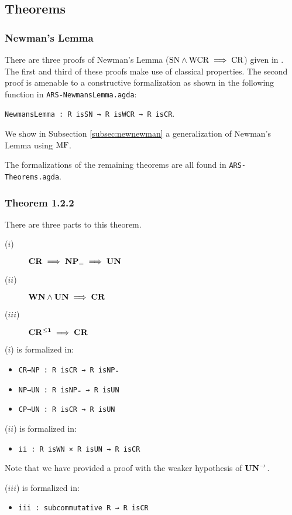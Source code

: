 \subsection{Theorems}\label{subsec:theorems}
\subsubsection{Newman's Lemma}
There are three proofs of Newman's Lemma ($\mathrm{SN} \land \mathrm{WCR} \implies \mathrm{CR}$) given in \terese. 
The first and third of these proofs make use of classical properties. The second proof is amenable to a 
constructive formalization as shown in the following function in \texttt{ARS-NewmansLemma.agda}:

\verb|NewmansLemma : R isSN → R isWCR → R isCR|.

We show in Subsection \ref{subsec:newnewman} a generalization of Newman's Lemma using $\mathrm{MF}$. 

The formalizations of the remaining theorems are all found in \texttt{ARS-Theorems.agda}. 
\subsubsection{Theorem 1.2.2}
There are three parts to this theorem. 
\begin{description}
    \item[($i$)] $\mathbf{CR} \implies \mathbf{NP_=} \implies \mathbf{UN}$
    \item[($ii$)] $\mathbf{WN} \land \mathbf{UN} \implies \mathbf{CR}$  
    \item[($iii$)] $\mathbf{CR^{\le 1}} \implies \mathbf{CR}$
\end{description}

($i$) is formalized in:
\begin{itemize}
    \item \verb|CR→NP : R isCR → R isNP₌|
    \item \verb|NP→UN : R isNP₌ → R isUN|
    \item \verb|CP→UN : R isCR → R isUN|
\end{itemize}

($ii$) is formalized in:
\begin{itemize}
    \item \verb|ii : R isWN × R isUN → R isCR|
\end{itemize}
Note that we have provided a proof with the weaker hypothesis of $\mathbf{UN}^{\to}$. 

($iii$) is formalized in:
\begin{itemize}
    \item \verb|iii : subcommutative R → R isCR|
\end{itemize}

